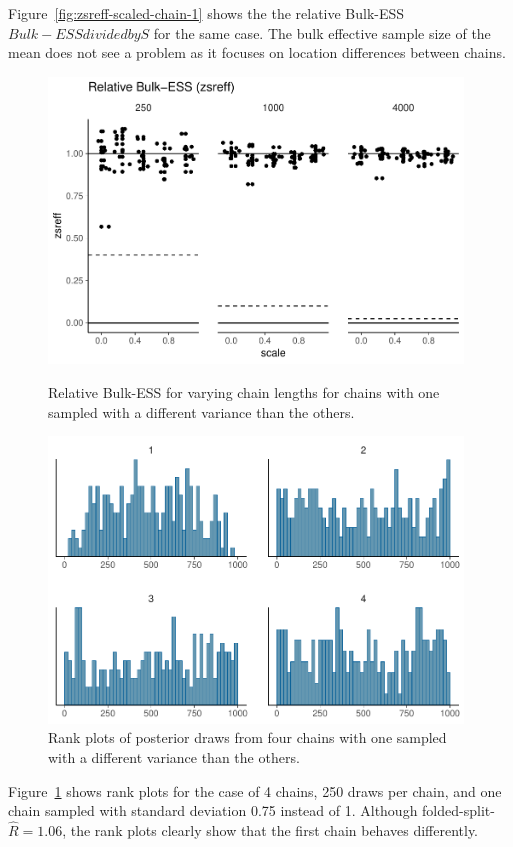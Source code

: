 \documentclass[american,]{article}
\begin{document}
Figure~\ref{fig:zsreff-scaled-chain-1} shows the the relative Bulk-ESS
\(Bulk-ESS divided by S\) for the same case. The bulk effective sample
size of the mean does not see a problem as it focuses on location
differences between chains.
\begin{figure}[tp]
  \centering
  \begin{minipage}{0.48\textwidth}
  \includegraphics[width=0.98\textwidth]{graphics/zsreff-scaled-chain-1.pdf}
  \caption{Relative Bulk-ESS for varying chain lengths for chains with
    one sampled with a different variance than the others.}
  \label{fig:zsreff-scaled-chain-1}
\end{minipage}
\hfill
  \begin{minipage}{0.48\textwidth}
  \includegraphics[width=0.98\textwidth]{graphics/hist-scaled-chain-1.pdf}
  \caption{Rank plots of posterior draws from four chains with
    one sampled with a different variance than the others.}
  \label{fig:hist-scaled-chain-1}
\end{minipage}
\end{figure}
Figure~\ref{fig:hist-scaled-chain-1} shows rank plots for the case of
4 chains, 250 draws per chain, and one chain sampled with standard
deviation 0.75 instead of 1. Although
folded-split-\(\widehat{R} = 1.06\), the rank plots clearly show that
the first chain behaves differently.
\end{document}
